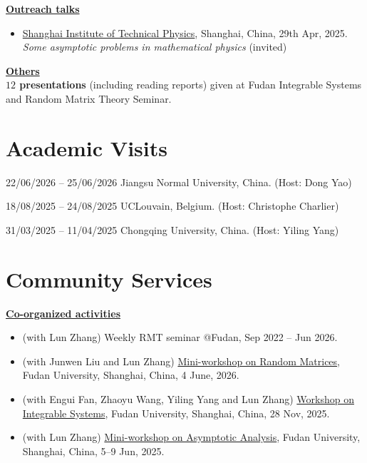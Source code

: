 \documentclass[12pt,a4paper]{article}
\begin{document}
\begin{cv}{}
\noindent\textbf{\underline{Outreach talks}}
\begin{itemize}
\item  \href{https://shanghai.phys.ac.cn/}{Shanghai Institute of Technical Physics}, Shanghai, China, 29th Apr, 2025. \\ {\slshape Some asymptotic problems in mathematical physics} (invited)
\end{itemize}
\vspace{1em}

\noindent\textbf{\underline{Others}}\\
{\bf $12$ presentations} (including reading reports) given at Fudan Integrable Systems and Random Matrix Theory Seminar.



\section{Academic Visits}
\begin{cvlist}{}
\item[22/06/2026 -- 25/06/2026] Jiangsu Normal University, China. (Host: Dong Yao)
\item[18/08/2025 -- 24/08/2025] UCLouvain, Belgium. (Host: Christophe Charlier)
\item[31/03/2025 -- 11/04/2025] Chongqing University, China. (Host: Yiling Yang)
\end{cvlist}


\section{Community Services}
\textbf{\underline{Co-organized activities}}
\begin{itemize}
    \item (with Lun Zhang) Weekly RMT seminar @Fudan, Sep 2022 -- Jun 2026.
    \item (with Junwen Liu and Lun Zhang) \href{https://math.fudan.edu.cn/_upload/article/files/bf/bb/3eb14d574ea3bbb877861fd87c7b/56f02e01-5db4-4adb-8590-4b64eebccdbb.pdf}{Mini-workshop on Random Matrices}, Fudan University, Shanghai, China, 4 June, 2026.
    \item (with Engui Fan, Zhaoyu Wang, Yiling Yang and Lun Zhang) \href{https://math.fudan.edu.cn/_upload/article/files/a9/9c/8be14e254849b524c008b2093535/9f98a404-4d6d-41e8-95bc-7cad6f041059.pdf}{Workshop on Integrable Systems}, Fudan University, Shanghai, China, 28 Nov, 2025.
    \item (with Lun Zhang) \href{https://math.fudan.edu.cn/_upload/article/files/3a/3a/08debe5a45b4b2dea17af0208fee/a2664c71-3aaa-40cf-ba4b-412ba0816503.pdf}{Mini-workshop on Asymptotic Analysis}, Fudan University, Shanghai, China, 5--9 Jun, 2025.
\end{itemize}
\vspace{1em}


\end{cv}
\end{document}
